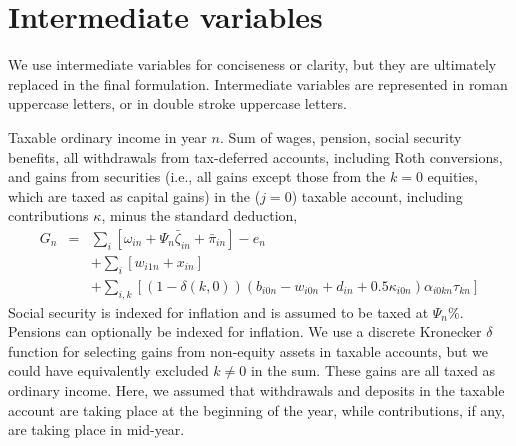\documentclass{report}[fleqn,12pt]
\begin{document}
\section{Intermediate variables}
We use intermediate variables for conciseness or clarity,
but they are ultimately replaced in the final formulation.
Intermediate variables are represented in roman uppercase letters, or in double stroke uppercase letters.
\begin{description}[leftmargin=4em,style=multiline]
\item [$G_n$]
	Taxable ordinary income in year $n$. Sum of wages, pension, social security benefits, all withdrawals
	from tax-deferred accounts, including Roth conversions, and gains from securities
	(i.e., all gains except those from the $k=0$ equities, which are taxed as capital gains)
	in the ($j=0$) taxable account, including contributions $\kappa$, minus the standard deduction,
	\begin{eqnarray}
		\label{Eq:Tx2}
		G_n &=& 
		\sum_i [\omega_{in} + \Psi_n\bar\zeta_{in} + \bar{\pi}_{in}]
		- e_n
		\nonumber \\
		&& + \sum_i [w_{i1n} + x_{in}]
		\nonumber \\
		&& + \sum_{i,k} 
		[(1-\delta(k, 0))(b_{i0n} - w_{i0n} + d_{in} + 0.5\kappa_{i0n})\alpha_{i0kn}\tau_{kn}]
	\end{eqnarray}
	Social security is indexed for inflation and is assumed to be taxed at $\Psi_n$\%.
	Pensions can optionally be indexed for inflation.
	We use a discrete Kronecker $\delta$ function for selecting gains from non-equity assets in
	taxable accounts, but we could have equivalently excluded $k \neq 0$ in the sum.
	These gains are all taxed as ordinary income. Here, we assumed that
	withdrawals and deposits in the taxable account are taking place at the beginning of the year, while
	contributions, if any, are taking place in mid-year.


\end{description}
\end{document}
